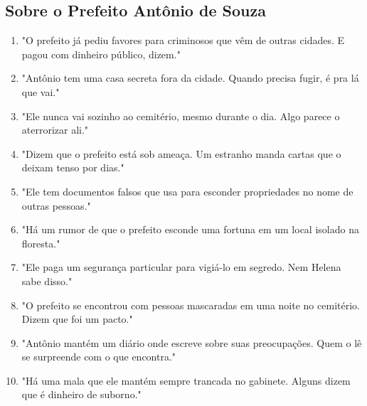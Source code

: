 \subsection*{Sobre o Prefeito Antônio de Souza}
\begin{enumerate}
    \item "O prefeito já pediu favores para criminosos que vêm de outras cidades. E pagou com dinheiro público, dizem."
    \item "Antônio tem uma casa secreta fora da cidade. Quando precisa fugir, é pra lá que vai."
    \item "Ele nunca vai sozinho ao cemitério, mesmo durante o dia. Algo parece o aterrorizar ali."
    \item "Dizem que o prefeito está sob ameaça. Um estranho manda cartas que o deixam tenso por dias."
    \item "Ele tem documentos falsos que usa para esconder propriedades no nome de outras pessoas."
    \item "Há um rumor de que o prefeito esconde uma fortuna em um local isolado na floresta."
    \item "Ele paga um segurança particular para vigiá-lo em segredo. Nem Helena sabe disso."
    \item "O prefeito se encontrou com pessoas mascaradas em uma noite no cemitério. Dizem que foi um pacto."
    \item "Antônio mantém um diário onde escreve sobre suas preocupações. Quem o lê se surpreende com o que encontra."
    \item "Há uma mala que ele mantém sempre trancada no gabinete. Alguns dizem que é dinheiro de suborno."
\end{enumerate}

